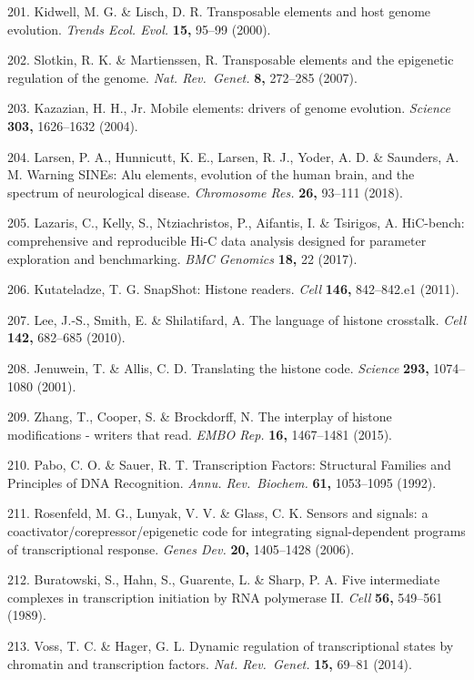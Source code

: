 \documentclass[11pt,twoside]{MPIthesis}
\theoremstyle{definition}
\theoremstyle{definition}
\theoremstyle{definition}
\theoremstyle{remark}
\begin{document}
201. Kidwell, M. G. \& Lisch, D. R. Transposable elements and host
genome evolution. \emph{Trends Ecol. Evol.} \textbf{15,} 95--99 (2000).

202. Slotkin, R. K. \& Martienssen, R. Transposable elements and the
epigenetic regulation of the genome. \emph{Nat. Rev.~Genet.} \textbf{8,}
272--285 (2007).

203. Kazazian, H. H., Jr. Mobile elements: drivers of genome evolution.
\emph{Science} \textbf{303,} 1626--1632 (2004).

204. Larsen, P. A., Hunnicutt, K. E., Larsen, R. J., Yoder, A. D. \&
Saunders, A. M. Warning SINEs: Alu elements, evolution of the human
brain, and the spectrum of neurological disease. \emph{Chromosome Res.}
\textbf{26,} 93--111 (2018).

205. Lazaris, C., Kelly, S., Ntziachristos, P., Aifantis, I. \&
Tsirigos, A. HiC-bench: comprehensive and reproducible Hi-C data
analysis designed for parameter exploration and benchmarking. \emph{BMC
Genomics} \textbf{18,} 22 (2017).

206. Kutateladze, T. G. SnapShot: Histone readers. \emph{Cell}
\textbf{146,} 842--842.e1 (2011).

207. Lee, J.-S., Smith, E. \& Shilatifard, A. The language of histone
crosstalk. \emph{Cell} \textbf{142,} 682--685 (2010).

208. Jenuwein, T. \& Allis, C. D. Translating the histone code.
\emph{Science} \textbf{293,} 1074--1080 (2001).

209. Zhang, T., Cooper, S. \& Brockdorff, N. The interplay of histone
modifications - writers that read. \emph{EMBO Rep.} \textbf{16,}
1467--1481 (2015).

210. Pabo, C. O. \& Sauer, R. T. Transcription Factors: Structural
Families and Principles of DNA Recognition. \emph{Annu. Rev.~Biochem.}
\textbf{61,} 1053--1095 (1992).

211. Rosenfeld, M. G., Lunyak, V. V. \& Glass, C. K. Sensors and
signals: a coactivator/corepressor/epigenetic code for integrating
signal-dependent programs of transcriptional response. \emph{Genes Dev.}
\textbf{20,} 1405--1428 (2006).

212. Buratowski, S., Hahn, S., Guarente, L. \& Sharp, P. A. Five
intermediate complexes in transcription initiation by RNA polymerase II.
\emph{Cell} \textbf{56,} 549--561 (1989).

213. Voss, T. C. \& Hager, G. L. Dynamic regulation of transcriptional
states by chromatin and transcription factors. \emph{Nat. Rev.~Genet.}
\textbf{15,} 69--81 (2014).


\end{document}
